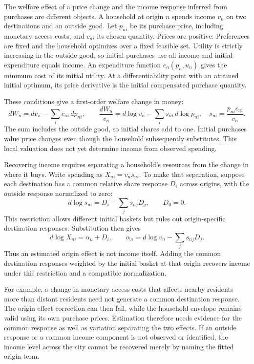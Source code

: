 The welfare effect of a price change and the income response inferred from
purchases are different objects. A household at origin $n$ spends income $v_n$
on two destinations and an outside good. Let $p_{ni}$ be its purchase price,
including monetary access costs, and $c_{ni}$ its chosen quantity. Prices are
positive. Preferences are fixed and the household optimizes over a fixed feasible
set. Utility is strictly increasing in the outside good, so initial purchases
use all income and initial expenditure equals income. An expenditure
function $e_n(p_n,u_n)$ gives the minimum cost of its initial utility. At a
differentiability point with an attained initial optimum, its price derivative
is the initial compensated purchase quantity.

These conditions give a first-order welfare change in money:
\[
 dW_n=dv_n-\sum_i c_{ni}\,dp_{ni},\qquad
 \frac{dW_n}{v_n}=d\log v_n-\sum_i s_{ni}\,d\log p_{ni},
 \quad s_{ni}=\frac{p_{ni}c_{ni}}{v_n}.
\]
The sum includes the outside good, so initial shares add to one. Initial
purchases value price changes even though the household subsequently substitutes.
This local valuation does not yet determine income from observed spending.

Recovering income requires separating a household's resources from the change
in where it buys. Write spending as $X_{ni}=v_n s_{ni}$. To make that separation,
suppose each destination has a common relative share response $D_i$ across
origins, with the outside response normalized to zero:
\[
 d\log s_{ni}=D_i-\sum_j s_{nj}D_j,\qquad D_0=0.
\]
This restriction allows different initial baskets but rules out origin-specific
destination responses. Substitution then gives
\[
 d\log X_{ni}=\alpha_n+D_i,\qquad
 \alpha_n=d\log v_n-\sum_j s_{nj}D_j.
\]
Thus an estimated origin effect is not income itself. Adding the common
destination responses weighted by the initial basket at that origin recovers income
under this restriction and a compatible normalization.

For example, a change in monetary access costs that affects nearby residents
more than distant residents need not generate a common destination response.
The origin effect correction can then fail, while the household envelope remains
valid using its own purchase prices. Estimation therefore needs evidence for
the common response as well as variation separating the two effects. If an
outside response or a common income component is not observed or identified,
the income level across the city cannot be recovered merely by naming the fitted origin term.
